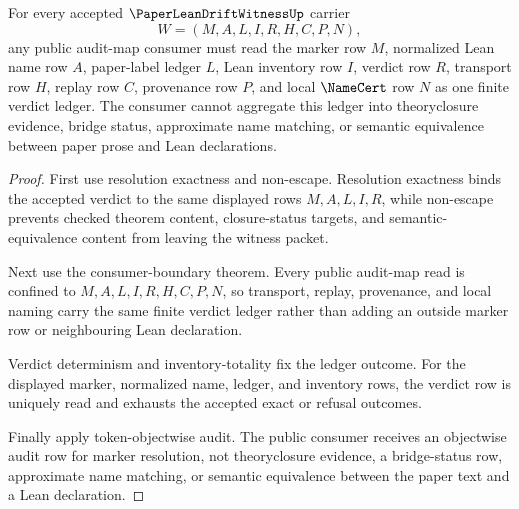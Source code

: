 \begin{theorem}
\label{thm:paper-lean-drift-witness-public-verdict-ledger}
For every accepted $\PaperLeanDriftWitnessUp$ carrier
$$
W=(M,A,L,I,R,H,C,P,N),
$$
any public audit-map consumer must read the marker row $M$, normalized Lean name row $A$, paper-label ledger $L$, Lean inventory row $I$, verdict row $R$, transport row $H$, replay row $C$, provenance row $P$, and local $\NameCert$ row $N$ as one finite verdict ledger. The consumer cannot aggregate this ledger into theoryclosure evidence, bridge status, approximate name matching, or semantic equivalence between paper prose and Lean declarations.
\end{theorem}
\begin{proof}
First use resolution exactness and non-escape. Resolution exactness binds the accepted verdict to the same displayed rows $M,A,L,I,R$, while non-escape prevents checked theorem content, closure-status targets, and semantic-equivalence content from leaving the witness packet.

Next use the consumer-boundary theorem. Every public audit-map read is confined to $M,A,L,I,R,H,C,P,N$, so transport, replay, provenance, and local naming carry the same finite verdict ledger rather than adding an outside marker row or neighbouring Lean declaration.

Verdict determinism and inventory-totality fix the ledger outcome. For the displayed marker, normalized name, ledger, and inventory rows, the verdict row is uniquely read and exhausts the accepted exact or refusal outcomes.

Finally apply token-objectwise audit. The public consumer receives an objectwise audit row for marker resolution, not theoryclosure evidence, a bridge-status row, approximate name matching, or semantic equivalence between the paper text and a Lean declaration.
\end{proof}

